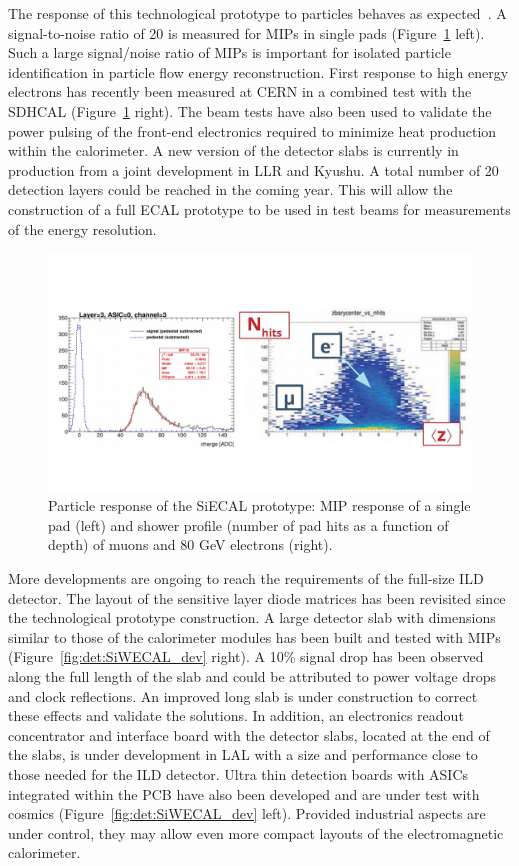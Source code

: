 The response of this technological prototype to particles behaves as expected~\cite{Kawagoe:2019dzh}. A signal-to-noise ratio of 20 is measured for MIPs in single pads (Figure~\ref{fig:det:SiWECAL_signals} left). Such a large signal/noise ratio of MIPs is important for isolated particle identification in particle flow energy reconstruction. First response to high energy electrons has recently been measured at CERN in a combined test with the SDHCAL (Figure~\ref{fig:det:SiWECAL_signals} right). The beam tests have also been used to validate the power pulsing of the front-end electronics required to minimize heat production within the calorimeter. A new version of the detector slabs is currently in production from a joint development in LLR and Kyushu. A total number of 20 detection layers could be reached in the coming year. This will allow the construction of a full ECAL prototype to be used in test beams for measurements of the energy resolution.

\begin{figure}[t!]
\centering
\includegraphics[width=1.0\hsize]{Detector/fig/SiWECAL_signals.jpg}
\caption{Particle response of the SiECAL prototype: MIP response of a single pad (left) and shower profile (number of pad hits as a function of depth) of muons and 80 GeV electrons (right).}
\label{fig:det:SiWECAL_signals}
\end{figure}

More developments are ongoing to reach the requirements of the full-size ILD detector. The layout of the sensitive layer diode matrices has been revisited since the technological prototype construction. A large detector slab with dimensions similar to those of the calorimeter modules has been built and tested with MIPs~\cite{Balagura:2017vvf} (Figure~\ref{fig:det:SiWECAL_dev} right). A 10\% signal drop has been observed along the full length of the slab and could be attributed to power voltage drops and clock reflections. An improved long slab is under construction to correct these effects and validate the solutions. In addition, an electronics readout concentrator and interface board with the detector slabs, located at the end of the slabs, is under development in LAL with a size and performance close to those needed for the ILD detector. Ultra thin detection boards with ASICs integrated within the PCB have also been developed and are under test with cosmics (Figure~\ref{fig:det:SiWECAL_dev} left). Provided industrial aspects are under control, they may allow even more compact layouts of the electromagnetic calorimeter. 

